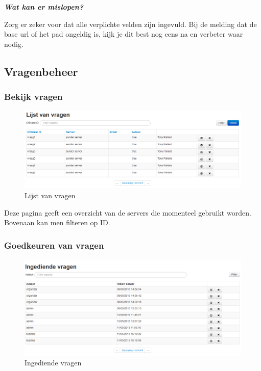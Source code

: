 \documentclass[]{article}
\begin{document}
\textbf{\textit{Wat kan er mislopen?}}

Zorg er zeker voor dat alle verplichte velden zijn ingevuld. Bij de melding dat de base url of het pad ongeldig is, kijk je dit best nog eens na en verbeter waar nodig.

\subsection{Vragenbeheer}

\subsubsection{Bekijk vragen}

\begin{figure}[!ht]
	\centering
	\includegraphics[width=1\textwidth]{img/questions}
	\caption{Lijst van vragen}
	\label{questions}
\end{figure}

Deze pagina geeft een overzicht van de servers die momenteel gebruikt worden. Bovenaan kan men filteren op ID. 

\subsubsection{Goedkeuren van vragen}

\begin{figure}[!ht]
	\centering
	\includegraphics[width=1\textwidth]{img/questionsubmits}
	\caption{Ingediende vragen}
	\label{questionsubmits}
\end{figure}
\end{document}
